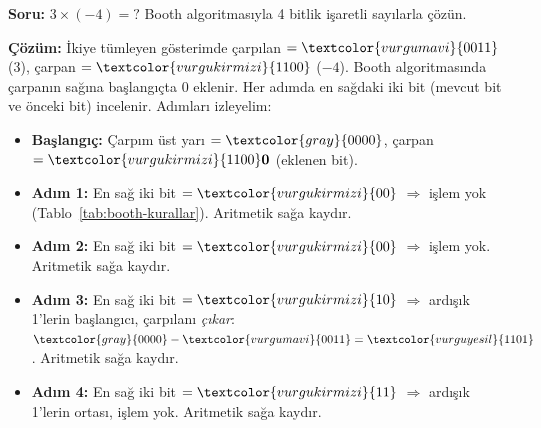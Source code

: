 \begin{ornek}[5.7]
\textbf{Soru:} $3 \times (-4) = ?$ \quad Booth algoritmasıyla 4 bitlik işaretli sayılarla çözün.

\textbf{Çözüm:} İkiye tümleyen gösterimde çarpılan $= \textcolor{vurgumavi}{0011}$ (3), çarpan $= \textcolor{vurgukirmizi}{1100}$ ($-4$). Booth algoritmasında çarpanın sağına başlangıçta $0$ eklenir. Her adımda en sağdaki iki bit (mevcut bit ve önceki bit) incelenir. Adımları izleyelim:

\begin{itemize}[nosep]
\item \textbf{Başlangıç:} Çarpım üst yarı $= \textcolor{gray}{0000}$, çarpan $= \textcolor{vurgukirmizi}{1100}\mathbf{0}$ (eklenen bit).
\item \textbf{Adım 1:} En sağ iki bit $= \textcolor{vurgukirmizi}{00}$ $\Rightarrow$ işlem yok (Tablo~\ref{tab:booth-kurallar}). Aritmetik sağa kaydır.
\item \textbf{Adım 2:} En sağ iki bit $= \textcolor{vurgukirmizi}{00}$ $\Rightarrow$ işlem yok. Aritmetik sağa kaydır.
\item \textbf{Adım 3:} En sağ iki bit $= \textcolor{vurgukirmizi}{10}$ $\Rightarrow$ ardışık 1'lerin başlangıcı, çarpılanı \emph{çıkar}: $\textcolor{gray}{0000} - \textcolor{vurgumavi}{0011} = \textcolor{vurguyesil}{1101}$. Aritmetik sağa kaydır.
\item \textbf{Adım 4:} En sağ iki bit $= \textcolor{vurgukirmizi}{11}$ $\Rightarrow$ ardışık 1'lerin ortası, işlem yok. Aritmetik sağa kaydır.
\end{itemize}


\end{ornek}
